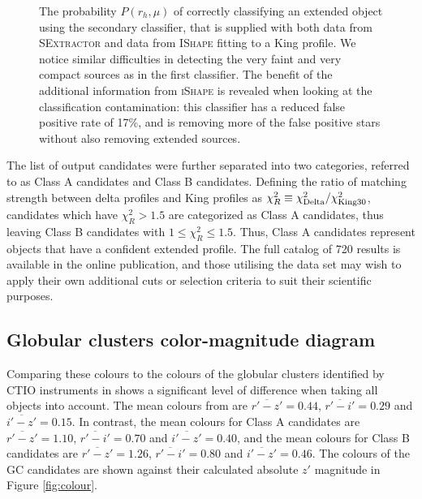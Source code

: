 \documentclass[useAMS,usenatbib]{mn2e}
\begin{document}
\begin{figure}
\begin{minipage}[t]{.49\textwidth}
		\caption{The probability $P(r_h, \mu)$ of correctly classifying an extended object using the secondary classifier, that is supplied with both data from \textsc{SExtractor} and data from \textsc{IShape} fitting to a King profile. We notice similar difficulties in detecting the very faint and very compact sources as in the first classifier. The benefit of the additional information from \textsc{iShape} is revealed when looking at the classification contamination: this classifier has a reduced false positive rate of 17\%, and is removing more of the false positive stars without also removing extended sources.}
		\label{fig:comp2}
	\end{minipage}
\end{figure}

The list of output candidates were further separated into two categories, referred to as Class A candidates and Class B candidates. Defining the ratio of matching strength between delta profiles and King profiles as $\chi^2_R \equiv \chi^2_{\rm{Delta}}  / \chi^2_{\rm{King30}}$, candidates which have  $\chi^2_R > 1.5$ are categorized as Class A candidates, thus leaving Class B candidates with $1 \leq \chi^2_R \leq 1.5$. Thus, Class A candidates represent objects that have a confident extended profile. The full catalog of 720 results is available in the online publication, and those utilising the data set may wish to apply their own additional cuts or selection criteria to suit their scientific purposes.






\subsection{Globular clusters color-magnitude diagram}
\label{sec:gc_cmd}



 Comparing these colours to the colours of the globular clusters identified by CTIO instruments in \citet{Vanderbeke2014} shows a significant level of difference when taking all objects into account. The mean colours from \citet{Vanderbeke2014} are $\overline{r'-z'} = 0.44$, $\overline{r'-i'} = 0.29$ and $\overline{i'-z'} = 0.15$. In contrast, the mean colours for Class A candidates are $\overline{r'-z'} = 1.10$, $\overline{r'-i'} = 0.70$ and $\overline{i'-z'} = 0.40$, and the mean colours for Class B candidates are $\overline{r'-z'} = 1.26$, $\overline{r'-i'} = 0.80$ and $\overline{i'-z'} = 0.46$. The colours of the GC candidates are shown against their calculated absolute $z'$ magnitude in Figure \ref{fig:colour}.
 
\end{document}
